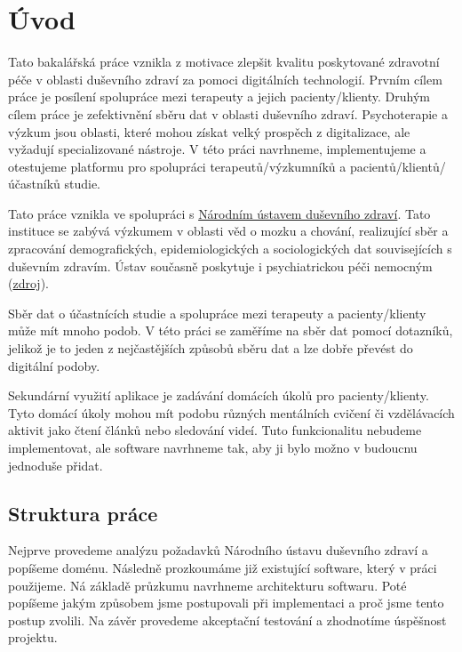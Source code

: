 \chapter*{Úvod}

Tato bakalářská práce vznikla z motivace zlepšit kvalitu poskytované zdravotní péče v oblasti duševního zdraví za pomoci digitálních technologií.
Prvním cílem práce je posílení spolupráce mezi terapeuty a jejich pacienty/klienty.
Druhým cílem práce je zefektivnění sběru dat v oblasti duševního zdraví.
Psychoterapie a výzkum jsou oblasti, které mohou získat velký prospěch z digitalizace, ale vyžadují specializované nástroje.
V této práci navrhneme, implementujeme a otestujeme platformu pro spolupráci terapeutů/výzkumníků a pacientů/klientů/účastníků studie.

Tato práce vznikla ve spolupráci s \href{https://www.nudz.cz/}{Národním ústavem duševního zdraví}.
Tato instituce se zabývá výzkumem v oblasti věd o mozku a chování, realizující sběr a zpracování demografických, epidemiologických a sociologických dat souvisejících s duševním zdravím.
Ústav současně poskytuje i psychiatrickou péči nemocným (\href{https://cs.wikipedia.org/wiki/Národní_ústav_duševního_zdraví}{zdroj}).

Sběr dat o účastnících studie a spolupráce mezi terapeuty a pacienty/klienty může mít mnoho podob.
V této práci se zaměříme na sběr dat pomocí dotazníků, jelikož je to jeden z nejčastějších způsobů sběru dat a lze dobře převést do digitální podoby.

Sekundární využití aplikace je zadávání domácích úkolů pro pacienty/klienty.
Tyto domácí úkoly mohou mít podobu různých mentálních cvičení či vzdělávacích aktivit jako čtení článků nebo sledování videí.
Tuto funkcionalitu nebudeme implementovat, ale software navrhneme tak, aby ji bylo možno v budoucnu jednoduše přidat.

\section*{Struktura práce}\label{sec:struktura-prace}

Nejprve provedeme analýzu požadavků Národního ústavu duševního zdraví a popíšeme doménu.
Následně prozkoumáme již existující software, který v práci použijeme.
Ná základě průzkumu navrhneme architekturu softwaru.
Poté popíšeme jakým způsobem jsme postupovali při implementaci a proč jsme tento postup zvolili.
Na závěr provedeme akceptační testování a zhodnotíme úspěšnost projektu.